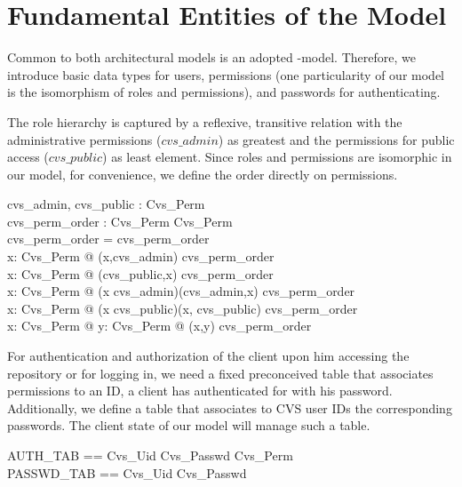 \section{Fundamental Entities of the Model}\label{sec:basics}


\vspace{1ex}\noindent

Common to both architectural models is an adopted \rbac-model.  Therefore, we
introduce basic data types for users, permissions (one particularity of our
model is the isomorphism of roles and permissions), and passwords for
authenticating.
\begin{zed}
\end{zed}

The role hierarchy is captured by a reflexive,
transitive relation with the administrative permissions ($cvs\_admin$)
as greatest and the permissions for public access ($cvs\_public$) as
least element.  Since roles and permissions are isomorphic in our
model, for convenience, we define the order directly on permissions.
\begin{doc}{4}
  \begin{axdef}
    cvs\_admin, cvs\_public : Cvs\_Perm \\
    cvs\_perm\_order        : Cvs\_Perm \rel Cvs\_Perm \\
    \where
    cvs\_perm\_order = cvs\_perm\_order \star \\
    \forall x: Cvs\_Perm @ (x,cvs\_admin) \in cvs\_perm\_order \\
    \forall x: Cvs\_Perm @ (cvs\_public,x) \in cvs\_perm\_order \\
    \forall x: Cvs\_Perm @ (x \neq cvs\_admin)\implies (cvs\_admin,x) \notin cvs\_perm\_order \\
    \forall x: Cvs\_Perm @ (x \neq cvs\_public)\implies (x, cvs\_public) \notin cvs\_perm\_order \\
    \forall x: Cvs\_Perm @ \exists y: Cvs\_Perm @ (x,y) \in cvs\_perm\_order\\
  \end{axdef}
\end{doc}

For authentication and
authorization of the client upon him accessing
the repository or for logging in, we need a fixed preconceived table
that associates permissions to an ID, a client has authenticated for
with his password.  Additionally, we define a table that associates to
CVS user IDs the corresponding passwords.  The client state of our
model will manage such a table.
\begin{zed}
  AUTH\_TAB == Cvs\_Uid \cross Cvs\_Passwd \pfun Cvs\_Perm \\
  PASSWD\_TAB == Cvs\_Uid \rel Cvs\_Passwd \\
\end{zed}


